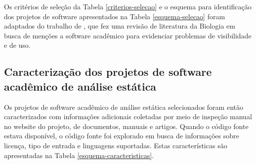 Os critérios de seleção da Tabela \ref{criterios-selecao} e o esquema para
identificação dos projetos de software apresentados na Tabela
\ref{esquema-selecao} foram adaptados do trabalho de
, que fez uma revisão de literatura da Biologia
em busca de menções a software acadêmico para evidenciar problemas de
visibilidade e de uso.


\subsection{Caracterização dos projetos de software acadêmico de análise estática} %

Os projetos de software acadêmico de análise estática selecionados foram então
caracterizados com informações adicionais coletadas por meio de inspeção manual
no website do projeto, de documentos, manuais e artigos. Quando o código fonte
estava disponível, o código fonte foi explorado em busca de informações sobre
licença, tipo de entrada e linguagens suportadas. Estas características são apresentadas
na Tabela \ref{esquema-caracteristicas}.


